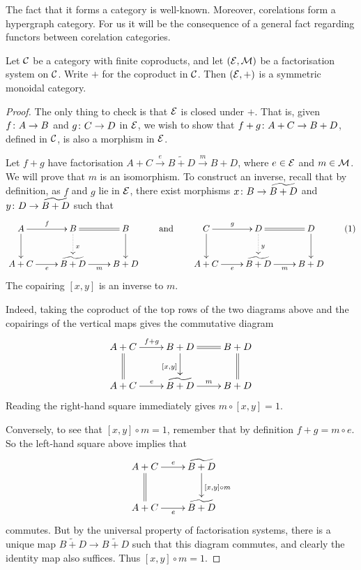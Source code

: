 The fact that it forms a category is well-known. Moreover, corelations form a
hypergraph category. For us it will be the consequence of a general fact
regarding functors between corelation categories.

\begin{lemma}
  Let $\mathcal C$ be a category with finite coproducts, and let $(\mathcal E, \mathcal M)$ be a
  factorisation system on $\mathcal C$. Write $+$ for the coproduct in $\mathcal C$. Then
  $(\mathcal E,+)$ is a symmetric monoidal category.
\end{lemma}
\begin{proof}
  The only thing to check is that $\mathcal E$ is closed under $+$. That is, given
  $f{\colon} A \to B$ and $g{\colon} C \to D$ in $\mathcal E$, we wish to show that
  $f+g{\colon} A+C \to B+D$, defined in $\mathcal C$, is also a morphism in $\mathcal E$. 

  Let $f+g$ have factorisation $A+C \stackrel{e}\longrightarrow \widetilde{B+D}
  \stackrel{m}\longrightarrow B+D$, where $e \in \mathcal E$ and $m \in \mathcal
  M$. We will prove that $m$ is an isomorphism. To construct an inverse, recall
  that by definition, as $f$ and $g$ lie in $\mathcal E$, there exist morphisms
  $x{\colon} B \to \widetilde{B+D}$ and $y{\colon} D \to \widetilde{B+D}$ such that
  \[ \label{eq.coreltensor}
    \xymatrixcolsep{2pc}
    \xymatrixrowsep{2pc}
    \xymatrix{
      A \ar[r]^f \ar[d] & B \ar@{=}[r] \ar@{.>}[d]^x & B
      \ar[d] \\
      A+C \ar[r]_{e}&\widetilde{B+D} \ar[r]_{m} & B+D
    }
    \qquad \mbox{and} \qquad
    \xymatrixcolsep{2pc}
    \xymatrixrowsep{2pc}
    \xymatrix{
      C \ar[r]^g \ar[d] & D \ar@{=}[r] \ar@{.>}[d]^y & D
      \ar[d] \\
      A+C \ar[r]_{e}&\widetilde{B+D} \ar[r]_{m} & B+D
    }
    \tag{1}
  \]
  The copairing $[x,y]$ is an inverse to $m$. 
  
  Indeed, taking the coproduct of the top rows of the two diagrams above and the
  copairings of the vertical maps gives the commutative diagram
  \[
    \xymatrix{
      A+C \ar[r]^{f+g} \ar@{=}[d] & B+D \ar@{=}[r] \ar[d]_{[x,y]} & B+D \ar@{=}[d] \\
      A+C \ar[r]^{e} & \widetilde{B+D} \ar[r]^{m} & B+D
    }
  \]
  Reading the right-hand square immediately gives $m \circ [x,y] =1$.
  
  Conversely, to see that $[x,y] \circ m = 1$, remember that by definition $f+g
  = m \circ e$. So the left-hand square above implies that
  \[
    \xymatrixcolsep{2pc}
    \xymatrixrowsep{2pc}
    \xymatrix{
      A+C \ar[r]^e \ar@{=}[d] & \widetilde{B+D} \ar[d]^{[x,y] \circ m} \\
      A+C \ar[r]_{e}&\widetilde{B+D} 
    }
  \]
  commutes. But by the universal property of factorisation systems, there is a
  unique map $\widetilde{B+D} \to \widetilde{B+D}$ such that this diagram
  commutes, and clearly the identity map also suffices. Thus $[x,y] \circ m =
  1$.
\end{proof}

